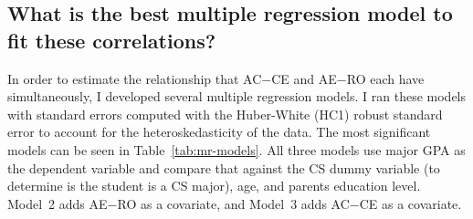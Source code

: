%
%

\subsection{What is the best multiple regression model to fit these correlations?}
In order to estimate the relationship that AC$-$CE and AE$-$RO each have simultaneously, I developed several multiple regression models. I ran these models with standard errors computed with the Huber-White (HC1) robust standard error to account for the heteroskedasticity of the data. The most significant models can be seen in Table~\ref{tab:mr-models}. All three models use major GPA as the dependent variable and compare that against the CS dummy variable (to determine is the student is a CS major), age, and parents education level. Model~2 adds AE$-$RO as a covariate, and Model~3 adds AC$-$CE as a covariate.

